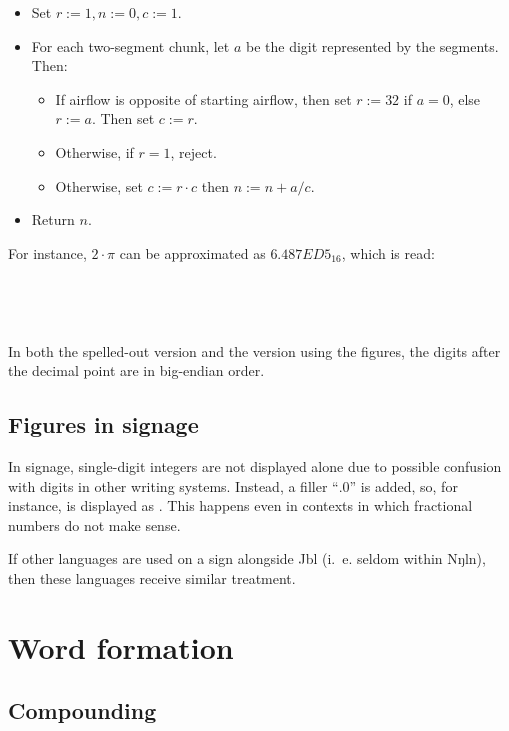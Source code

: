 \documentclass{book}
\newcommand{\lname}{Jbl}
\begin{document}
\begin{itemize}
  \item Set $r := 1, n := 0, c := 1$.
  \item For each two-segment chunk, let $a$ be the digit represented by the segments. Then:
  \begin{itemize}
    \item If airflow is opposite of starting airflow, then set $r := 32$ if $a = 0$, else $r := a$. Then set $c := r$.
    \item Otherwise, if $r = 1$, reject.
    \item Otherwise, set $c := r \cdot c$ then $n := n + a / c$.
  \end{itemize}
  \item Return $n$.
\end{itemize}

For instance, $2 \cdot \pi$ can be approximated as $6.487ED5_{16}$, which is read: \\
~\\
 \\
 \\
 \\

In both the spelled-out version and the version using the figures, the digits after the decimal point are in big-endian order.

\section{Figures in signage}

In signage, single-digit integers are not displayed alone due to possible confusion with digits in other writing systems. Instead, a filler ``$.0$'' is added, so, for instance,  is displayed as . This happens even in contexts in which fractional numbers do not make sense.

If other languages are used on a sign alongside \lname{} (i.~e. seldom within Nŋln), then these languages receive similar treatment.

\chapter{Word formation}

\section{Compounding}
\end{document}
